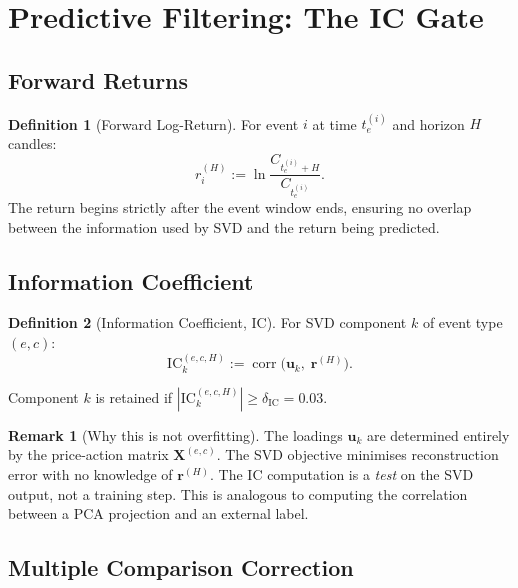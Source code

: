 \documentclass[11pt,a4paper]{article}
\theoremstyle{definition}
\newtheorem{definition}{Definition}[section]
\newtheorem{remark}{Remark}[section]
\theoremstyle{plain}
\newcommand{\Xmat}{\mathbf{X}}
\newcommand{\bvec}[1]{\mathbf{#1}}
\newcommand{\corr}{\operatorname{corr}}
\begin{document}
\section{Predictive Filtering: The IC Gate}
\label{sec:ic}

\subsection{Forward Returns}

\begin{definition}[Forward Log-Return]
\label{def:forward_return}
For event $i$ at time $t_e^{(i)}$ and horizon $H$ candles:
\begin{equation}
    r_i^{(H)} := \ln\!\frac{C_{t_e^{(i)}+H}}{C_{t_e^{(i)}}}.
    \label{eq:forward_return}
\end{equation}
The return begins strictly after the event window ends, ensuring no overlap
between the information used by SVD and the return being predicted.
\end{definition}

\subsection{Information Coefficient}

\begin{definition}[Information Coefficient, IC]
\label{def:ic}
For SVD component $k$ of event type $(e, c)$:
\begin{equation}
    \mathrm{IC}_k^{(e,c,H)}
    := \corr\!\bigl(\bvec{u}_k,\; \bvec{r}^{(H)}\bigr).
    \label{eq:ic}
\end{equation}
\end{definition}

Component $k$ is retained if $|\mathrm{IC}_k^{(e,c,H)}| \geq
\delta_{\mathrm{IC}} = 0.03$.

\begin{remark}[Why this is not overfitting]
The loadings $\bvec{u}_k$ are determined entirely by the price-action
matrix $\Xmat^{(e,c)}$. The SVD objective minimises reconstruction error
with no knowledge of $\bvec{r}^{(H)}$. The IC computation is a
\emph{test} on the SVD output, not a training step. This is analogous to
computing the correlation between a PCA projection and an external label.
\end{remark}

\subsection{Multiple Comparison Correction}
\end{document}
